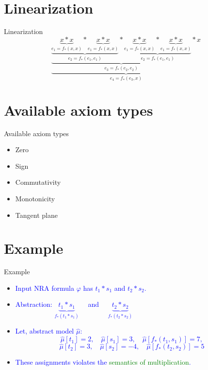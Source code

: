 \documentclass[]{beamer}
\begin{document}
\section{Linearization}
\begin{frame}{Linearization}
    $$\underbrace{ \underbrace{ \underbrace{ \underbrace{ x \ast x }\limits_{e_1 = f_{*}(x, x)} \ast \underbrace{ x \ast x }\limits_{e_1 = f_{*}(x, x)}}\limits_{e_{2} = f_{*}(e_{1}, e_{1})} \ast \underbrace{ \underbrace{ x \ast x }\limits_{e_1 = f_{*}(x, x)} \ast \underbrace{ x \ast x }\limits_{e_1 = f_{*}(x, x)}}\limits_{e_{2} = f_{*}(e_{1}, e_{1})}}\limits_{e_{3} = f_{*}(e_{2}, e_{2})} \ast x}\limits_{e_{4} = f_{*}(e_{3}, x)}$$
\end{frame}

\section{Available axiom types}
\begin{frame}{Available axiom types}
    \begin{itemize}
        \item Zero
        \item Sign
		\item Commutativity
		\item Monotonicity
		\item Tangent plane
    \end{itemize}
\end{frame}

\section{Example}
\begin{frame}{Example}
    \begin{itemize}
        \item \textcolor<1>{blue}{Input NRA formula $\varphi$ has $t_{1} \ast s_{1}$ and $t_{2} \ast s_{2}$.}
        \bigskip
        \item \textcolor<2>{blue}{Abstraction: \quad $\underbrace{t_{1} \ast s_{1}}\limits_{f_{*}(t_{1} \ast s_{1})} \quad$ and $\quad \underbrace{t_{2} \ast s_{2}}\limits_{f_{*}(t_{2} \ast s_{2})}$}
		\item \textcolor<3>{blue}{Let, abstract model $\hat{\mu}$:
    $$\hat{\mu}[t_{1}] = 2, \quad \hat{\mu}[s_{1}] = 3, \quad \hat{\mu}[f_{\ast}(t_{1}, s_{1})] = 7,$$ $$\hat{\mu}[t_{2}] = 3, \quad \hat{\mu}[s_{2}] = -4, \quad \hat{\mu}[f_{\ast}(t_{2}, s_{2})] = 5$$}
    \item \textcolor<4>{blue}{These assignments violates the \textcolor<4>{green}{semantics of multiplication}.}
    \end{itemize}
\end{frame}
\end{document}
